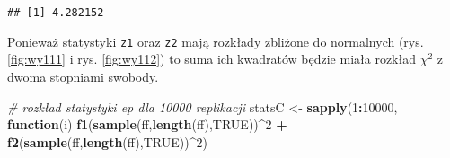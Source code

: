 \documentclass[polish,]{book}
\newenvironment{Shaded}{\begin{snugshade}}{\end{snugshade}}
\newcommand{\CommentTok}[1]{\textcolor[rgb]{0.56,0.35,0.01}{\textit{#1}}}
\newcommand{\ControlFlowTok}[1]{\textcolor[rgb]{0.13,0.29,0.53}{\textbf{#1}}}
\newcommand{\DecValTok}[1]{\textcolor[rgb]{0.00,0.00,0.81}{#1}}
\newcommand{\KeywordTok}[1]{\textcolor[rgb]{0.13,0.29,0.53}{\textbf{#1}}}
\newcommand{\NormalTok}[1]{#1}
\newcommand{\OperatorTok}[1]{\textcolor[rgb]{0.81,0.36,0.00}{\textbf{#1}}}
\newcommand{\OtherTok}[1]{\textcolor[rgb]{0.56,0.35,0.01}{#1}}
\newcommand{\StringTok}[1]{\textcolor[rgb]{0.31,0.60,0.02}{#1}}
\begin{document}
\begin{verbatim}
## [1] 4.282152
\end{verbatim}

Ponieważ statystyki \texttt{z1} oraz \texttt{z2} mają rozkłady zbliżone do normalnych (rys. \ref{fig:wy111} i rys. \ref{fig:wy112}) to suma ich kwadratów będzie miała rozkład \(\chi^2\) z dwoma stopniami swobody.

\begin{Shaded}
\begin{Highlighting}[]
\CommentTok{# rozkład statystyki ep dla 10000 replikacji}
\NormalTok{statsC <-}\StringTok{ }\KeywordTok{sapply}\NormalTok{(}\DecValTok{1}\OperatorTok{:}\DecValTok{10000}\NormalTok{, }\ControlFlowTok{function}\NormalTok{(i) }\KeywordTok{f1}\NormalTok{(}\KeywordTok{sample}\NormalTok{(ff,}\KeywordTok{length}\NormalTok{(ff),}\OtherTok{TRUE}\NormalTok{))}\OperatorTok{^}\DecValTok{2} \OperatorTok{+}
\StringTok{                   }\KeywordTok{f2}\NormalTok{(}\KeywordTok{sample}\NormalTok{(ff,}\KeywordTok{length}\NormalTok{(ff),}\OtherTok{TRUE}\NormalTok{))}\OperatorTok{^}\DecValTok{2}\NormalTok{)}
\end{Highlighting}
\end{Shaded}
\end{document}
